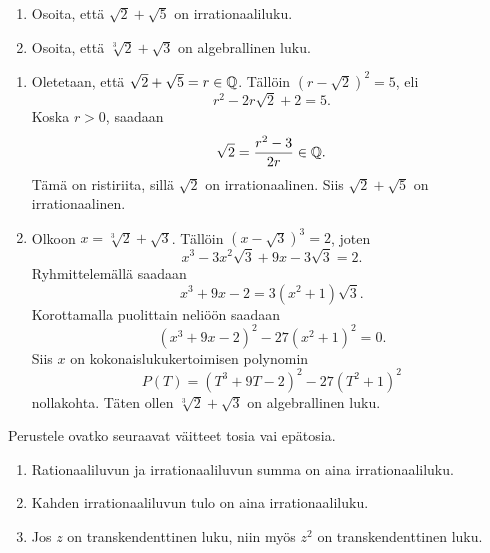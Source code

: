 \documentclass[11pt,a4paper]{amsart}
\begin{document}
\begin{exercise}
\leavevmode\par
\begin{enumerate}[label=(\alph*), topsep=0.35em]
  \item Osoita, että \(\sqrt{2} + \sqrt{5}\) on irrationaaliluku.
  \item Osoita, että \(\sqrt[3]{2} + \sqrt{3}\) on algebrallinen luku.
\end{enumerate}
\end{exercise}

\begin{solution}
\leavevmode\par
\begin{enumerate}[label=(\alph*), topsep=0.35em]
  \item Oletetaan, että \(\sqrt{2} + \sqrt{5} = r \in \mathbb{Q}\). Tällöin
    \((r - \sqrt{2})^2 = 5\), eli
    \[
      r^2 - 2r\sqrt{2} + 2 = 5.
    \]
    Koska \(r>0\), saadaan
    \[
      \sqrt{2} = \frac{r^2 - 3}{2r} \in \mathbb{Q}.
    \]
    Tämä on ristiriita, sillä \(\sqrt{2}\) on irrationaalinen.
    Siis \(\sqrt{2} + \sqrt{5}\) on irrationaalinen.
  \item Olkoon \(x=\sqrt[3]{2}+\sqrt{3}\). Tällöin
    \((x-\sqrt{3})^3=2\), joten
    \[
      x^3-3x^2\sqrt{3}+9x-3\sqrt{3}=2.
    \]
    Ryhmittelemällä saadaan
    \[
      x^3+9x-2=3(x^2+1)\sqrt{3}.
    \]
    Korottamalla puolittain neliöön saadaan
    \[
      (x^3+9x-2)^2-27(x^2+1)^2=0.
    \]
    Siis \(x\) on kokonaislukukertoimisen polynomin
    \[
      P(T)=(T^3+9T-2)^2-27(T^2+1)^2
    \]
    nollakohta. Täten ollen \(\sqrt[3]{2}+\sqrt{3}\) on
    algebrallinen luku.
\end{enumerate}
\end{solution}

\begin{exercise}
Perustele ovatko seuraavat väitteet tosia vai epätosia.
\begin{enumerate}[label=(\alph*), topsep=0.35em]
  \item Rationaaliluvun ja irrationaaliluvun summa on aina
    irrationaaliluku.
  \item Kahden irrationaaliluvun tulo on aina irrationaaliluku.
  \item Jos \(z\) on transkendenttinen luku, niin myös \(z^2\) on
    transkendenttinen luku.
\end{enumerate}
\end{exercise}
\end{document}
